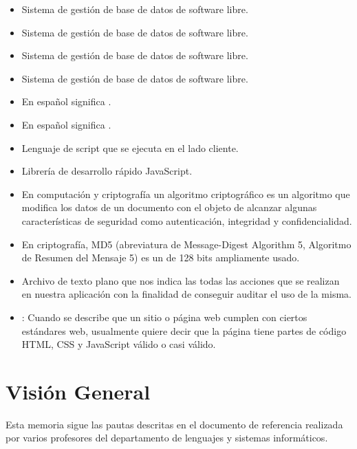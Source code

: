 \begin{itemize}
\item {} Sistema de gestión de base de datos de software libre.
\item {} Sistema de gestión de base de datos de software libre.
\item {} Sistema de gestión de base de datos de software libre.
\item {} Sistema de gestión de base de datos de software libre.
\item {} En español significa .
\item {} En español significa
  .
\item {} Lenguaje de script que se ejecuta en el lado
  cliente.
\item {} Librería de desarrollo rápido JavaScript.
\item {} En computación y criptografía un
  algoritmo criptográfico es un algoritmo que modifica los datos de un documento
  con el objeto de alcanzar algunas características de seguridad como
  autenticación, integridad y confidencialidad.
\item {} En criptografía, MD5 (abreviatura de
  Message-Digest Algorithm 5, Algoritmo de Resumen del Mensaje 5) es un
   de 128 bits ampliamente usado.
\item {} Archivo de texto plano que nos indica las todas las
  acciones que se realizan en nuestra aplicación con la finalidad de conseguir
  auditar el uso de la misma.
\item {}: Cuando se describe que un sitio o página web cumplen con ciertos estándares web, usualmente quiere decir que la página tiene partes de código HTML, CSS y JavaScript válido o casi válido.


\end{itemize}

\section{Visión General}
Esta memoria sigue las pautas descritas en el documento de referencia
 realizada por varios profesores del departamento de lenguajes y
sistemas informáticos.


